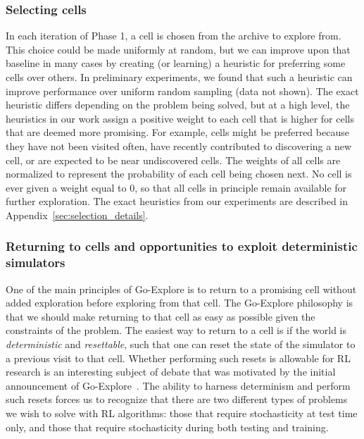\documentclass{article}
\begin{document}
\subsubsection{Selecting cells}
\label{sec:selecting_cells}

In each iteration of Phase 1, a cell is chosen from the archive to explore from. This choice could be made uniformly at random, but we can improve upon that baseline in many cases by creating (or learning) a heuristic for preferring some cells over others. In preliminary experiments, we found that such a heuristic can improve performance over uniform random sampling (data not shown).  The exact heuristic differs depending on the problem being solved, but at a high level, the heuristics in our work assign a positive weight to each cell that is higher for cells that are deemed more promising. For example, cells might be preferred because they have not been visited often, have recently contributed to discovering a new cell, or are expected to be near undiscovered cells. The weights of all cells are normalized to represent the probability of each cell being chosen next. No cell is ever given a weight equal to 0, so that all cells in principle remain available for further exploration. The exact heuristics from our experiments are described in Appendix~\ref{sec:selection_details}.

\subsubsection{Returning to cells and opportunities to exploit deterministic simulators}
\label{sec:determinism}

One of the main principles of Go-Explore is to return to a promising cell without added exploration before exploring from that cell. The Go-Explore philosophy is that we should make returning to that cell as easy as possible given the constraints of the problem. The easiest way to return to a cell is if the world is \emph{deterministic} and \emph{resettable}, such that one can reset the state of the simulator to a previous visit to that cell. Whether performing such resets is allowable for RL research is an interesting subject of debate that was motivated by the initial announcement of Go-Explore~\cite{ecoffet:bloggoexplore2018}. The ability to harness determinism and perform such resets forces us to recognize that there are two different types of problems we wish to solve with RL algorithms: those that require stochasticity at test time only, and those that require stochasticity during both testing and training. 
\end{document}
